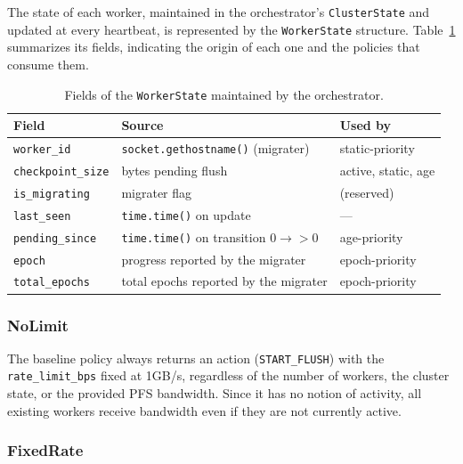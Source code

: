 \documentclass[sigplan,twocolumn,10pt,nonacm]{acmart}
\begin{document}
The state of each worker, maintained in the orchestrator's \texttt{ClusterState} and updated at every heartbeat, is represented by the \texttt{WorkerState} structure. Table~\ref{tab:worker-state} summarizes its fields, indicating the origin of each one and the policies that consume them.
\begin{table}[h]
    \centering
    \scriptsize
    \begin{tabular}{lll}
        \toprule
        \textbf{Field} & \textbf{Source} & \textbf{Used by} \\
        \midrule
        \texttt{worker\_id}       & \texttt{socket.gethostname()} (migrater)         & static-priority \\
        \texttt{checkpoint\_size} & bytes pending flush                              & active, static, age \\
        \texttt{is\_migrating}    & migrater flag                                    & (reserved) \\
        \texttt{last\_seen}       & \texttt{time.time()} on update                   & --- \\
        \texttt{pending\_since}   & \texttt{time.time()} on transition $0 \to {>}0$  & age-priority \\
        \texttt{epoch}            & progress reported by the migrater                & epoch-priority \\
        \texttt{total\_epochs}    & total epochs reported by the migrater            & epoch-priority \\
        \bottomrule
    \end{tabular}
    \caption{Fields of the \texttt{WorkerState} maintained by the orchestrator.}
    \label{tab:worker-state}
\end{table}

\subsubsection{NoLimit}
\label{sec:policy-nolimit}

The baseline policy always returns an action (\texttt{START\_FLUSH}) with the \texttt{rate\_limit\_bps} fixed at 1GB/s, regardless of the number of workers, the cluster state, or the provided PFS bandwidth. Since it has no notion of activity, all existing workers receive bandwidth even if they are not currently active.
\subsubsection{FixedRate}
\label{sec:policy-fixedrate}
\end{document}
